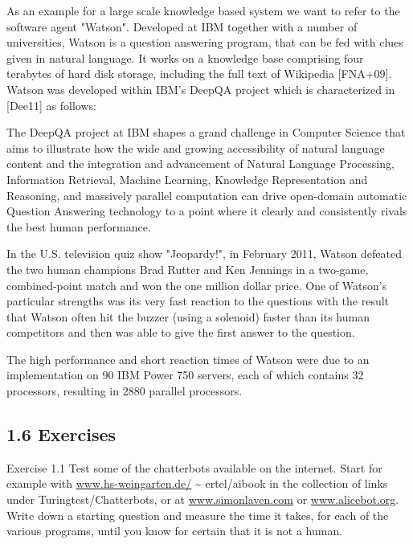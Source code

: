 \documentclass[10pt]{book}
\begin{document}
As an example for a large scale knowledge based system we want to refer to the software agent "Watson". Developed at IBM together with a number of universities, Watson is a question answering program, that can be fed with clues given in natural language. It works on a knowledge base comprising four terabytes of hard disk storage, including the full text of Wikipedia [FNA+09]. Watson was developed within IBM's DeepQA project which is characterized in [Dee11] as follows:

\begin{displayquote}
The DeepQA project at IBM shapes a grand challenge in Computer Science that aims to illustrate how the wide and growing accessibility of natural language content and the integration and advancement of Natural Language Processing, Information Retrieval, Machine Learning, Knowledge Representation and Reasoning, and massively parallel computation can drive open-domain automatic Question Answering technology to a point where it clearly and consistently rivals the best human performance.
\end{displayquote}

In the U.S. television quiz show "Jeopardy!", in February 2011, Watson defeated the two human champions Brad Rutter and Ken Jennings in a two-game, combined-point match and won the one million dollar price. One of Watson's particular strengths was its very fast reaction to the questions with the result that Watson often hit the buzzer (using a solenoid) faster than its human competitors and then was able to give the first answer to the question.

The high performance and short reaction times of Watson were due to an implementation on 90 IBM Power 750 servers, each of which contains 32 processors, resulting in 2880 parallel processors.

\subsection*{1.6 Exercises}
Exercise 1.1 Test some of the chatterbots available on the internet. Start for example with \href{http://www.hs-weingarten.de/}{www.hs-weingarten.de/} \~{} ertel/aibook in the collection of links under Turingtest/Chatterbots, or at \href{http://www.simonlaven.com}{www.simonlaven.com} or \href{http://www.alicebot.org}{www.alicebot.org}. Write down a starting question and measure the time it takes, for each of the various programs, until you know for certain that it is not a human.
\end{document}
